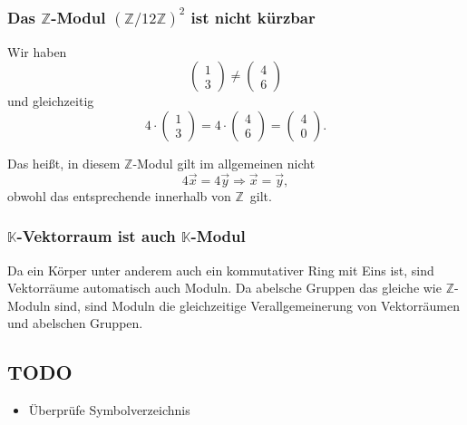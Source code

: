 \documentclass[a4paper]{amsart}
\theoremstyle{definition}
\newcommand{\Z}{\ensuremath{\mathbb{ Z }}}
\newcommand{\K}{\ensuremath{\mathbb{ K }}}
\newcommand{\zz}[1]{\ensuremath{\Z /#1\Z}}
\begin{document}
\subsubsection{Das \Z-Modul $(\zz{12})^2$ ist nicht kürzbar}
Wir haben 
\begin{equation}
   \begin{pmatrix} 1 \\ 3 \end{pmatrix} \ne
   \begin{pmatrix} 4 \\ 6 \end{pmatrix}
\end{equation}
und gleichzeitig
\begin{equation}
   4 \cdot \begin{pmatrix} 1 \\ 3 \end{pmatrix} =
   4 \cdot \begin{pmatrix} 4 \\ 6 \end{pmatrix} =
          \begin{pmatrix} 4 \\ 0 \end{pmatrix}.
\end{equation}

Das heißt, in diesem \Z-Modul gilt im allgemeinen nicht
\begin{equation}
   4 \vec x = 4 \vec y \Rightarrow \vec x = \vec y,
\end{equation}
obwohl das entsprechende innerhalb von \Z\ gilt.

\subsubsection{$\K$-Vektorraum ist auch $\K$-Modul}
Da ein Körper unter anderem auch ein kommutativer Ring mit Eins ist, sind Vektorräume automatisch auch Moduln. Da abelsche Gruppen das gleiche wie \Z-Moduln sind, sind Moduln die gleichzeitige Verallgemeinerung von Vektorräumen und abelschen Gruppen.

\begin{backup}
\section{TODO}
\begin{itemize}
     \item Überprüfe Symbolverzeichnis
\end{itemize}


\end{backup}
\end{document}
